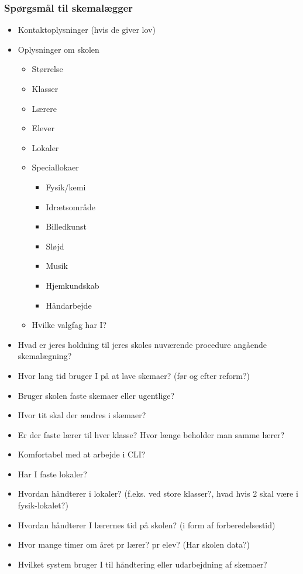 \documentclass[hidelinks, 12pt]{article}
\begin{document}
	\subsubsection*{Spørgsmål til skemalægger}
	\begin{itemize}
		\item Kontaktoplysninger (hvis de giver lov)
		\item Oplysninger om skolen
		\begin{itemize}
			\item Størrelse
			\item Klasser
			\item Lærere
			\item Elever
			\item Lokaler
			\item Speciallokaer
			\begin{itemize}
				\item Fysik/kemi
				\item Idrætsområde
				\item Billedkunst
				\item Sløjd
				\item Musik
				\item Hjemkundskab
				\item Håndarbejde
			\end{itemize}
			\item Hvilke valgfag har I?
		\end{itemize}
		\item Hvad er jeres holdning til jeres skoles nuværende procedure angående skemalægning?
		\item Hvor lang tid bruger I på at lave skemaer? (før og efter reform?)
		\item Bruger skolen faste skemaer eller ugentlige?
		\item Hvor tit skal der ændres i skemaer?
		\item Er der faste lærer til hver klasse? Hvor længe beholder man samme lærer?
		\item Komfortabel med at arbejde i CLI?
		\item Har I faste lokaler?
		\item Hvordan håndterer i lokaler? (f.eks. ved store klasser?, hvad hvis 2 skal være i fysik-lokalet?)
		\item Hvordan håndterer I lærernes tid på skolen? (i form af forberedelsestid)
		\item Hvor mange timer om året pr lærer? pr elev? (Har skolen data?)
		\item Hvilket system bruger I til håndtering eller udarbejdning af skemaer?

\end{itemize}
\end{document}
